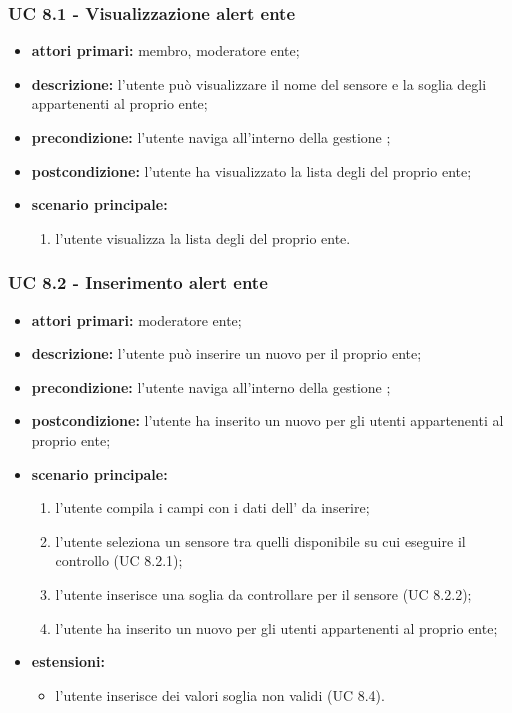 			\subsubsection{UC 8.1 - Visualizzazione alert ente}
			\begin{itemize}
				\item \textbf{attori primari:} membro, moderatore ente;
				\item \textbf{descrizione:} l'utente può visualizzare il nome del sensore e la soglia degli  appartenenti al proprio ente;
				\item \textbf{precondizione:} l'utente naviga all'interno della gestione ;
				\item \textbf{postcondizione:} l'utente ha visualizzato la lista degli  del proprio ente;
				\item \textbf{scenario principale:}
				\begin{enumerate}
					\item{l'utente visualizza la lista degli  del proprio ente.}
				\end{enumerate}
			\end{itemize}

			\subsubsection{UC 8.2 - Inserimento alert ente}
			\begin{itemize}
				\item \textbf{attori primari:} moderatore ente;
				\item \textbf{descrizione:} l'utente può inserire un nuovo  per il proprio ente;
				\item \textbf{precondizione:} l'utente naviga all'interno della gestione ;
				\item \textbf{postcondizione:} l'utente ha inserito un nuovo  per gli utenti appartenenti al proprio ente;
				\item \textbf{scenario principale:}
				\begin{enumerate}
					\item{l'utente compila i campi con i dati dell' da inserire;}
					\item l'utente seleziona un sensore tra quelli disponibile su cui eseguire il controllo (UC 8.2.1);
					\item l'utente inserisce una soglia da controllare per il sensore (UC 8.2.2);
					\item{l'utente ha inserito un nuovo  per gli utenti appartenenti al proprio ente;}
				\end{enumerate}
				\item \textbf{estensioni:}
				\begin{itemize}
					\item l'utente inserisce dei valori soglia non validi (UC 8.4).
				\end{itemize}
			\end{itemize}

